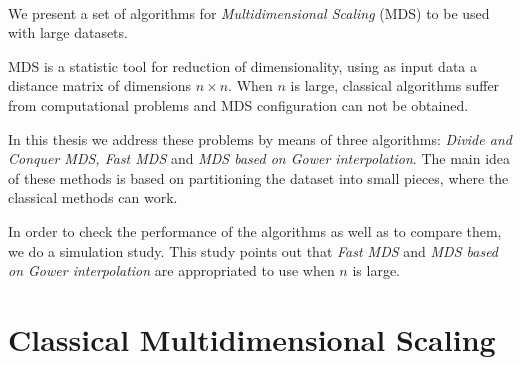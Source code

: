 \documentclass[11pt]{report}
\begin{document}










\thispagestyle{empty}





\clearpage\mbox{}\clearpage



 \\
\indent We present a set of algorithms for \textit{Multidimensional Scaling} (MDS) to 
be used with large datasets.

\indent MDS is a statistic tool for reduction of dimensionality, using as input
data a distance matrix of dimensions $n \times n$. When $n$ is large, classical
algorithms suffer from computational problems and MDS configuration can not be
obtained.

\indent In this thesis we address these problems by means of three algorithms:
\textit{Divide and Conquer MDS, Fast MDS} and 
\textit{MDS based on Gower interpolation}. The main idea of these methods is
based on partitioning the dataset into small pieces, where the classical 
methods can work.

\indent In order to check the performance of the algorithms as well as to 
compare them, we do a simulation study. This study
points out that \textit{Fast MDS} and \textit{MDS based on Gower interpolation} 
are appropriated to use when $n$ is large.

\tableofcontents
\thispagestyle{empty}

\chapter{Classical Multidimensional Scaling}
\end{document}
